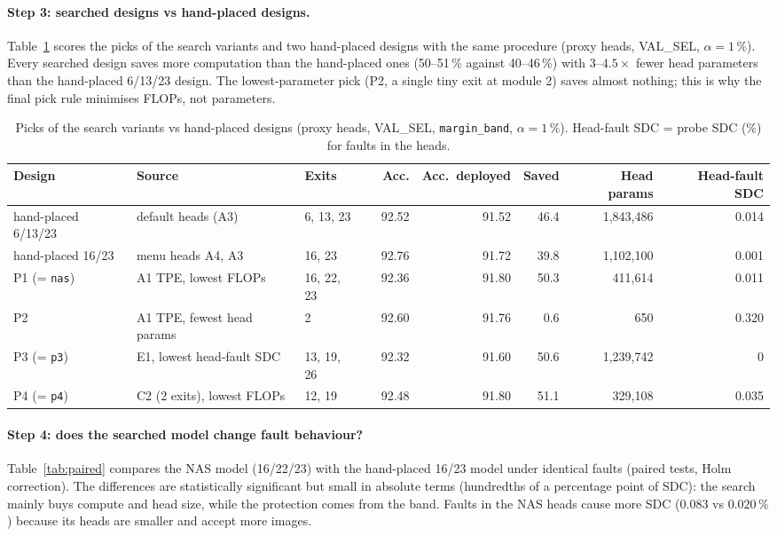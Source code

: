 \documentclass[10pt,a4paper]{article}
\newcommand{\meth}[1]{\texttt{#1}}
\newcommand{\ours}{\meth{margin\_band}}
\begin{document}
\paragraph{Step 3: searched designs vs hand-placed designs.} Table~\ref{tab:picks} scores the picks of the search
variants and two hand-placed designs with the same procedure (proxy heads, VAL\_SEL, $\alpha=1\,\%$). Every searched
design saves more computation than the hand-placed ones (50--51\,\% against 40--46\,\%) with $3$--$4.5\times$ fewer
head parameters than the hand-placed 6/13/23 design. The lowest-parameter pick (P2, a single tiny exit at
module 2) saves almost nothing; this is why the final pick rule minimises FLOPs, not parameters.

\begin{table}[H]
\centering\small
\setlength{\tabcolsep}{4pt}
\caption{Picks of the search variants vs hand-placed designs (proxy heads, VAL\_SEL, \ours, $\alpha=1\,\%$).
Head-fault SDC = probe SDC (\%) for faults in the heads.}
\label{tab:picks}
\begin{adjustbox}{max width=\linewidth}
\begin{tabular}{@{}llllrrrrr@{}}
\toprule
Design & Source & Exits & & Acc. & Acc.\ deployed & Saved & Head params & Head-fault SDC \\
\midrule
hand-placed 6/13/23 & default heads (A3)           & 6, 13, 23   & & 92.52 & 91.52 & 46.4 & 1{,}843{,}486 & 0.014 \\
hand-placed 16/23   & menu heads A4, A3            & 16, 23      & & 92.76 & 91.72 & 39.8 & 1{,}102{,}100 & 0.001 \\
\midrule
P1 (= \meth{nas})   & A1 TPE, lowest FLOPs         & 16, 22, 23  & & 92.36 & 91.80 & 50.3 & 411{,}614     & 0.011 \\
P2                  & A1 TPE, fewest head params   & 2           & & 92.60 & 91.76 & 0.6  & 650           & 0.320 \\
P3 (= \meth{p3})    & E1, lowest head-fault SDC    & 13, 19, 26  & & 92.32 & 91.60 & 50.6 & 1{,}239{,}742 & 0     \\
P4 (= \meth{p4})    & C2 (2 exits), lowest FLOPs   & 12, 19      & & 92.48 & 91.80 & 51.1 & 329{,}108     & 0.035 \\
\bottomrule
\end{tabular}
\end{adjustbox}
\end{table}

\paragraph{Step 4: does the searched model change fault behaviour?} Table~\ref{tab:paired} compares the NAS model
(16/22/23) with the hand-placed 16/23 model under identical faults (paired tests, Holm correction). The
differences are statistically significant but small in absolute terms (hundredths of a percentage point of SDC):
the search mainly buys compute and head size, while the protection comes from the band. Faults in the NAS heads
cause more SDC ($0.083$ vs $0.020\,\%$) because its heads are smaller and accept more images.
\end{document}
